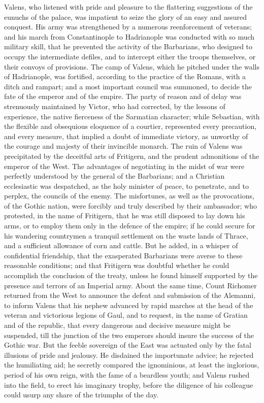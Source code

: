 Valens, who listened with pride and pleasure to the flattering
suggestions of the eunuchs of the palace, was impatient to seize
the glory of an easy and assured conquest. His army was
strengthened by a numerous reenforcement of veterans; and his
march from Constantinople to Hadrianople was conducted with so
much military skill, that he prevented the activity of the
Barbarians, who designed to occupy the intermediate defiles, and
to intercept either the troops themselves, or their convoys of
provisions. The camp of Valens, which he pitched under the walls
of Hadrianople, was fortified, according to the practice of the
Romans, with a ditch and rampart; and a most important council
was summoned, to decide the fate of the emperor and of the
empire. The party of reason and of delay was strenuously
maintained by Victor, who had corrected, by the lessons of
experience, the native fierceness of the Sarmatian character;
while Sebastian, with the flexible and obsequious eloquence of a
courtier, represented every precaution, and every measure, that
implied a doubt of immediate victory, as unworthy of the courage
and majesty of their invincible monarch. The ruin of Valens was
precipitated by the deceitful arts of Fritigern, and the prudent
admonitions of the emperor of the West. The advantages of
negotiating in the midst of war were perfectly understood by the
general of the Barbarians; and a Christian ecclesiastic was
despatched, as the holy minister of peace, to penetrate, and to
perplex, the councils of the enemy. The misfortunes, as well as
the provocations, of the Gothic nation, were forcibly and truly
described by their ambassador; who protested, in the name of
Fritigern, that he was still disposed to lay down his arms, or to
employ them only in the defence of the empire; if he could secure
for his wandering countrymen a tranquil settlement on the waste
lands of Thrace, and a sufficient allowance of corn and cattle.
But he added, in a whisper of confidential friendship, that the
exasperated Barbarians were averse to these reasonable
conditions; and that Fritigern was doubtful whether he could
accomplish the conclusion of the treaty, unless he found himself
supported by the presence and terrors of an Imperial army. About
the same time, Count Richomer returned from the West to announce
the defeat and submission of the Alemanni, to inform Valens that
his nephew advanced by rapid marches at the head of the veteran
and victorious legions of Gaul, and to request, in the name of
Gratian and of the republic, that every dangerous and decisive
measure might be suspended, till the junction of the two emperors
should insure the success of the Gothic war. But the feeble
sovereign of the East was actuated only by the fatal illusions of
pride and jealousy. He disdained the importunate advice; he
rejected the humiliating aid; he secretly compared the
ignominious, at least the inglorious, period of his own reign,
with the fame of a beardless youth; and Valens rushed into the
field, to erect his imaginary trophy, before the diligence of his
colleague could usurp any share of the triumphs of the day.

